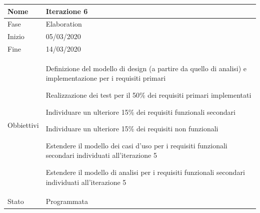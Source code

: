 \begin{center}
\begin{tabular}{ |p{2cm}|p{10cm}|  }
\hline
Nome & Iterazione 6 \\\hline
Fase & Elaboration \\\hline
Inizio & 05/03/2020 \\\hline
Fine &  14/03/2020  \\\hline
Obbiettivi & 
	\begin{compactitem}
		\item Definizione del modello di design (a partire da quello di analisi) e implementazione per i requisiti primari
		\item Realizzazione dei test per il 50\% dei requisiti primari implementati
		
		\item Individuare un ulteriore 15\% dei requisiti funzionali secondari %
		\item Individuare un ulteriore 15\% dei requisiti non funzionali %
		
		\item Estendere il modello dei casi d'uso per i requisiti funzionali secondari individuati all'iterazione 5
		\item Estendere il modello di analisi per i requisiti funzionali secondari individuati all'iterazione 5

	\end{compactitem}\\\hline
Stato &  Programmata \\\hline
\end{tabular}
\label{table:6}\newline


\end{center}
